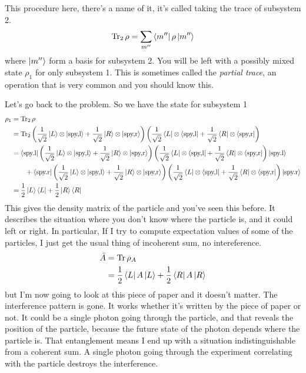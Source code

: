 This procedure here,
there's a name of it,
it's called taking the trace of subsystem 2.
\begin{align}
    \Tr_2 \rho = \sum_{m''}\bra{m''} \rho \ket{m''}
\end{align}
where $\ket{m''}$ form a basis for subsystem 2.
You will be left with a possibly mixed state $\rho_1$ for only subsystem 1.
This is sometimes called the \emph{partial trace},
an operation that is very common
and you should know this.

Let's go back to the problem.
So we have the state for subsystem 1
\begin{align}
    \rho_1 &=
    \Tr_2 \rho\\
    &=
    \Tr_2
    \left(
        \frac{1}{\sqrt{2}}\ket{L}\otimes\ket{\text{spy,l}}
        + \frac{1}{\sqrt{2}}\ket{R}\otimes\ket{\text{spy,r}}
    \right)
    \left(
        \frac{1}{\sqrt{2}}\bra{L}\otimes\bra{\text{spy,l}}
        + \frac{1}{\sqrt{2}}\bra{R}\otimes\bra{\text{spy,r}}
    \right)\\
    &= 
    \bra{\text{spy.l}}
    \left(
        \frac{1}{\sqrt{2}}\ket{L}\otimes\ket{\text{spy,l}}
        + \frac{1}{\sqrt{2}}\ket{R}\otimes\ket{\text{spy,r}}
    \right)
    \left(
        \frac{1}{\sqrt{2}}\bra{L}\otimes\bra{\text{spy,l}}
        + \frac{1}{\sqrt{2}}\bra{R}\otimes\bra{\text{spy,r}}
    \right)
    \ket{\text{spy.l}}\\\nonumber
    &\qquad+
    \bra{\text{spy.r}}
    \left(
        \frac{1}{\sqrt{2}}\ket{L}\otimes\ket{\text{spy,l}}
        + \frac{1}{\sqrt{2}}\ket{R}\otimes\ket{\text{spy,r}}
    \right)
    \left(
        \frac{1}{\sqrt{2}}\bra{L}\otimes\bra{\text{spy,l}}
        + \frac{1}{\sqrt{2}}\bra{R}\otimes\bra{\text{spy,r}}
    \right)
    \ket{\text{spy.r}}\\
    &= \frac{1}{2}\ket{L}\bra{L} + \frac{1}{2}\ket{R}\bra{R}
\end{align}
This gives the density matrix of the particle
and you've seen this before.
It describes the situation where you don't know where the particle is,
and it could left or right.
In particular,
If I try to compute expectation values of some of the particles,
I just get the usual thing of incoherent sum, no intereference.
\begin{align}
    \bar{A} &=
    \Tr \rho_A\\
    &= \frac{1}{2}\bra{L}A\ket{L}
    + \frac{1}{2}\bra{R}A\ket{R}
\end{align}
but I'm now going to look at this piece of paper and it doesn't matter.
The interference pattern is gone.
It works whether it's written by the piece of paper or not.
It could be a single photon going through the particle,
and that reveals the position of the particle,
because the future state of the photon depends where the particle is.
That entanglement means I end up with a situation indistinguishable from a
coherent sum.
A single photon going through the experiment
correlating with the particle destroys the interference.

